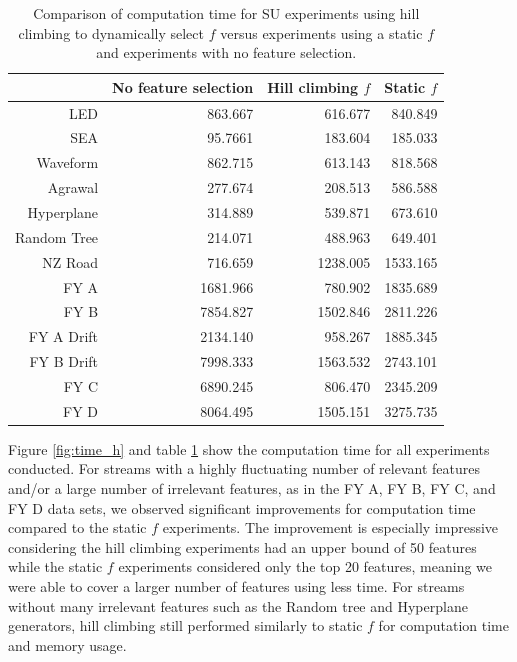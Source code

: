 \begin{table}[h]
\centering
\begin{tabular}{r|rrr}
						   & No feature selection & Hill climbing $f$ & Static $f$  \\ \hline
LED                        & 863.667   & 616.677    & 840.849   \\
SEA                        & 95.7661   & 183.604    & 185.033   \\
Waveform                   & 862.715   & 613.143    & 818.568   \\
Agrawal                    & 277.674   & 208.513    & 586.588   \\
Hyperplane                 & 314.889   & 539.871    & 673.610   \\
Random Tree                & 214.071   & 488.963    & 649.401   \\
NZ Road                    & 716.659   & 1238.005   & 1533.165  \\
FY A                       & 1681.966  & 780.902    & 1835.689  \\
FY B                       & 7854.827  & 1502.846   & 2811.226  \\
FY A Drift                 & 2134.140  & 958.267    & 1885.345  \\
FY B Drift                 & 7998.333  & 1563.532   & 2743.101  \\
FY C                       & 6890.245  & 806.470    & 2345.209  \\
FY D                       & 8064.495  & 1505.151   & 3275.735 
\end{tabular}
\caption{Comparison of computation time for SU experiments using hill climbing to dynamically select $f$ versus experiments using a static $f$ and experiments with no feature selection.}
\label{Table:H_Time_v_Static}
\end{table}

Figure \ref{fig:time_h} and table \ref{Table:H_Time_v_Static} show the computation time for all experiments conducted. For streams with a highly fluctuating number of relevant features and/or a large number of irrelevant features, as in the FY A, FY B, FY C, and FY D data sets, we observed significant improvements for computation time compared to the static $f$ experiments. The improvement is especially impressive considering the hill climbing experiments had an upper bound of 50 features while the static $f$ experiments considered only the top 20 features, meaning we were able to cover a larger number of features using less time. For streams without many irrelevant features such as the Random tree and Hyperplane generators, hill climbing still performed similarly to static $f$ for computation time and memory usage.

